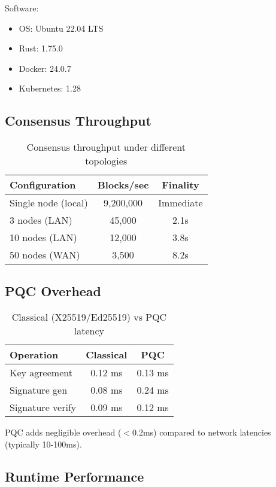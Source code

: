 \documentclass[11pt,twocolumn]{article}
\begin{document}
Software:
\begin{itemize}
\item OS: Ubuntu 22.04 LTS
\item Rust: 1.75.0
\item Docker: 24.0.7
\item Kubernetes: 1.28
\end{itemize}

\subsection{Consensus Throughput}

\begin{table}[h]
\centering
\begin{tabular}{|l|c|c|}
\hline
\textbf{Configuration} & \textbf{Blocks/sec} & \textbf{Finality} \\
\hline
Single node (local) & 9,200,000 & Immediate \\
3 nodes (LAN) & 45,000 & 2.1s \\
10 nodes (LAN) & 12,000 & 3.8s \\
50 nodes (WAN) & 3,500 & 8.2s \\
\hline
\end{tabular}
\caption{Consensus throughput under different topologies}
\label{tab:consensus}
\end{table}

\subsection{PQC Overhead}

\begin{table}[h]
\centering
\small
\begin{tabular}{|l|c|c|}
\hline
\textbf{Operation} & \textbf{Classical} & \textbf{PQC} \\
\hline
Key agreement & 0.12 ms & 0.13 ms \\
Signature gen & 0.08 ms & 0.24 ms \\
Signature verify & 0.09 ms & 0.12 ms \\
\hline
\end{tabular}
\caption{Classical (X25519/Ed25519) vs PQC latency}
\label{tab:pqc_overhead}
\end{table}

PQC adds negligible overhead ($<$0.2ms) compared to network latencies (typically 10-100ms).

\subsection{Runtime Performance}
\end{document}
